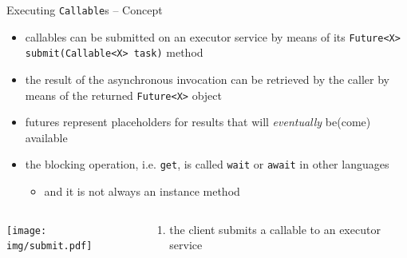 \documentclass[presentation]{beamer}\mode<presentation>{\usetheme{AMSBolognaFC}}
\begin{document}
\begin{frame}[c,allowframebreaks]{Executing \texttt{Callable}s -- Concept}

	

	\framebreak

	\begin{itemize}
		\item callables can be \alert{submitted} on an executor service by means of its \texttt{Future<X> submit(Callable<X> task)} method

		\vspace{.5cm}

		\item the result of the asynchronous invocation can be retrieved by the caller by means of the returned \texttt{Future<X>} object

		\vspace{.5cm}

		\item futures represent \alert{placeholders} for results that will \emph{eventually} be(come) available
	\end{itemize}

	\framebreak

	

	\begin{itemize}
		\item the blocking operation, i.e. \texttt{get}, is called \texttt{wait} or \texttt{\alert{await}} in other languages
		\begin{itemize}
			\item and it is not always an instance method
		\end{itemize}
	\end{itemize}

	\framebreak

	\begin{columns}
		\begin{column}{.6\linewidth}
			\begin{center}
				\texttt{[image: img/submit.pdf]}
			\end{center}
		\end{column}
		\begin{column}{.4\linewidth}
			\begin{enumerate}
				\item the client \alert{submits} a callable to an executor service


\end{enumerate}
\end{column}
\end{columns}
\end{frame}
\end{document}
